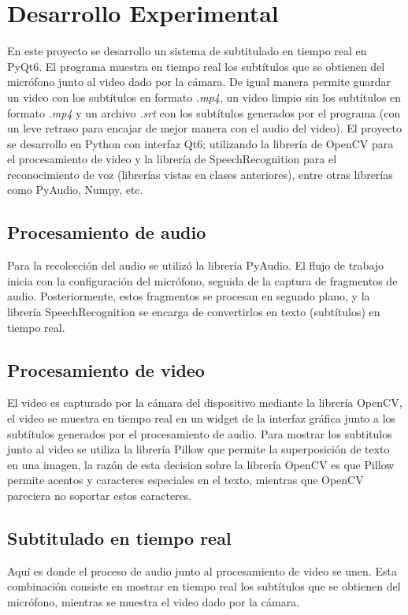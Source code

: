 \documentclass[conference]{IEEEtran}
\begin{document}
\section{Desarrollo Experimental}
En este proyecto se desarrollo un sistema de subtitulado en tiempo real en PyQt6. El programa muestra en tiempo real los subtítulos que se obtienen del micrófono junto al video dado por la cámara. De igual manera permite guardar un video con los subtítulos en formato \textit{.mp4}, un video limpio sin los subtítulos en formato \textit{.mp4} y un archivo \textit{.srt} con los subtítulos generados por el programa (con un leve retraso para encajar de mejor manera con el audio del video). El proyecto se desarrollo en Python con interfaz Qt6; utilizando la librería de OpenCV para el procesamiento de video y la librería de SpeechRecognition para el reconocimiento de voz (librerías vistas en clases anteriores), entre otras librerías como PyAudio, Numpy, etc.

\subsection{Procesamiento de audio}
Para la recolección del audio se utilizó la librería PyAudio. El flujo de trabajo inicia con la configuración del micrófono, seguida de la captura de fragmentos de audio. Posteriormente, estos fragmentos se procesan en segundo plano, y la librería SpeechRecognition se encarga de convertirlos en texto (subtítulos) en tiempo real.

\subsection{Procesamiento de video}
El video es capturado por la cámara del dispositivo mediante la librería OpenCV, el video se muestra en tiempo real en un widget de la interfaz gráfica junto a los subtítulos generados por el procesamiento de audio. Para mostrar los subtitulos junto al video se utiliza la librería Pillow que permite la superposición de texto en una imagen, la razón de esta decision sobre la librería OpenCV es que Pillow permite acentos y caracteres especiales en el texto, mientras que OpenCV pareciera no soportar estos caracteres.

\subsection{Subtitulado en tiempo real}
Aquí es donde el proceso de audio junto al procesamiento de video se unen. Esta combinación consiste en mostrar en tiempo real los subtítulos que se obtienen del micrófono, mientras se muestra el video dado por la cámara.
\end{document}

